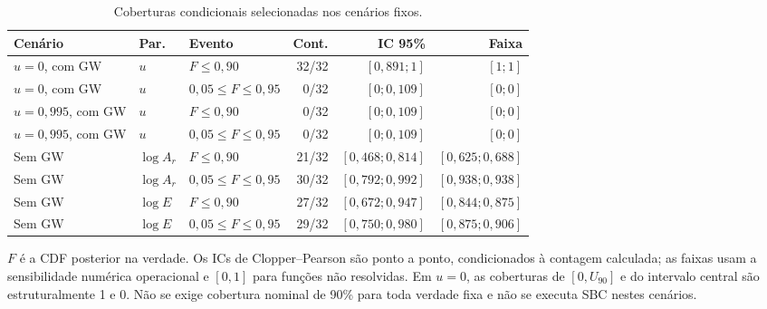\begin{table}[htbp]
\centering
\caption{Coberturas condicionais selecionadas nos cenários fixos.}
\label{tab:c07-fixed-coberturas}
\begingroup\small\setlength{\tabcolsep}{4pt}
\begin{tabular}{@{}lllr rr@{}}
\toprule
Cenário & Par. & Evento & Cont. & IC 95\% & Faixa \\
\midrule
$u=0$, com GW & $u$ & $F\leq0{,}90$ & 32/32 & $[0{,}891;1]$ & $[1;1]$ \\
$u=0$, com GW & $u$ & $0{,}05\leq F\leq0{,}95$ & 0/32 & $[0;0{,}109]$ & $[0;0]$ \\
$u=0{,}995$, com GW & $u$ & $F\leq0{,}90$ & 0/32 & $[0;0{,}109]$ & $[0;0]$ \\
$u=0{,}995$, com GW & $u$ & $0{,}05\leq F\leq0{,}95$ & 0/32 & $[0;0{,}109]$ & $[0;0]$ \\
Sem GW & $\log A_r$ & $F\leq0{,}90$ & 21/32 & $[0{,}468;0{,}814]$ & $[0{,}625;0{,}688]$ \\
Sem GW & $\log A_r$ & $0{,}05\leq F\leq0{,}95$ & 30/32 & $[0{,}792;0{,}992]$ & $[0{,}938;0{,}938]$ \\
Sem GW & $\log E$ & $F\leq0{,}90$ & 27/32 & $[0{,}672;0{,}947]$ & $[0{,}844;0{,}875]$ \\
Sem GW & $\log E$ & $0{,}05\leq F\leq0{,}95$ & 29/32 & $[0{,}750;0{,}980]$ & $[0{,}875;0{,}906]$ \\
\bottomrule
\end{tabular}
\endgroup
\par\smallskip\begin{minipage}{0.96\textwidth}\footnotesize $F$ é a CDF posterior na verdade. Os ICs de Clopper--Pearson são ponto a ponto, condicionados à contagem calculada; as faixas usam a sensibilidade numérica operacional e $[0,1]$ para funções não resolvidas. Em $u=0$, as coberturas de $[0,U_{90}]$ e do intervalo central são estruturalmente 1 e 0. Não se exige cobertura nominal de 90\% para toda verdade fixa e não se executa SBC nestes cenários.\end{minipage}
\end{table}
